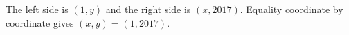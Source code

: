 The left side is $(1,y)$ and the right side is $(x,2017)$. Equality coordinate by coordinate gives $\boxed{(x,y)=(1,2017)}$.
